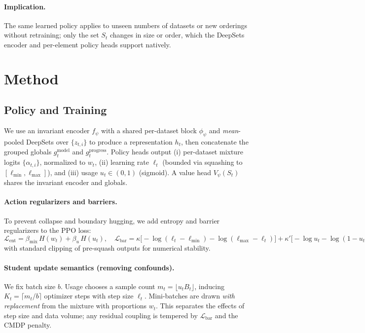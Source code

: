 \documentclass[11pt]{article}
\newcommand{\1}{\mathbf{1}}
\begin{document}
\paragraph{Implication.}
The same learned policy applies to unseen numbers of datasets or new orderings without retraining; only the set $S_t$ changes in size or order, which the DeepSets encoder and per-element policy heads support natively.

\section{Method}
\subsection{Policy and Training}
We use an invariant encoder $f_\psi$ with a shared per-dataset block $\phi_\psi$ and \emph{mean}-pooled DeepSets over $\{z_{t,i}\}$ to produce a representation $h_t$, then concatenate the grouped globals $g^{\text{model}}_t$ and $g^{\text{progress}}_t$.
Policy heads output (i) per-dataset mixture logits $\{\alpha_{t,i}\}$, normalized to $w_t$, (ii) learning rate $\ell_t$ (bounded via squashing to $[\ell_{\min},\ell_{\max}]$), and (iii) usage $u_t\in(0,1)$ (sigmoid).
A value head $V_\psi(S_t)$ shares the invariant encoder and globals.

\paragraph{Action regularizers and barriers.}
To prevent collapse and boundary hugging, we add entropy and barrier regularizers to the PPO loss:
\(
\mathcal{L}_{\text{ent}}= \beta_{\text{mix}}\, H(w_t) + \beta_u\, H(u_t),\quad
\mathcal{L}_{\text{bar}}= \kappa\big[-\log(\ell_t-\ell_{\min})-\log(\ell_{\max}-\ell_t)\big] + \kappa'\big[-\log u_t - \log (1-u_t)\big],
\)
with standard clipping of pre-squash outputs for numerical stability.

\paragraph{Student update semantics (removing confounds).}
We fix batch size $b$.
Usage chooses a sample count $m_t=\lfloor u_t B_t\rfloor$, inducing $K_t=\lceil m_t/b\rceil$ optimizer steps with step size $\ell_t$.
Mini-batches are drawn \emph{with replacement} from the mixture with proportions $w_t$.
This separates the effects of step size and data volume; any residual coupling is tempered by $\mathcal{L}_{\text{bar}}$ and the CMDP penalty.
\end{document}
